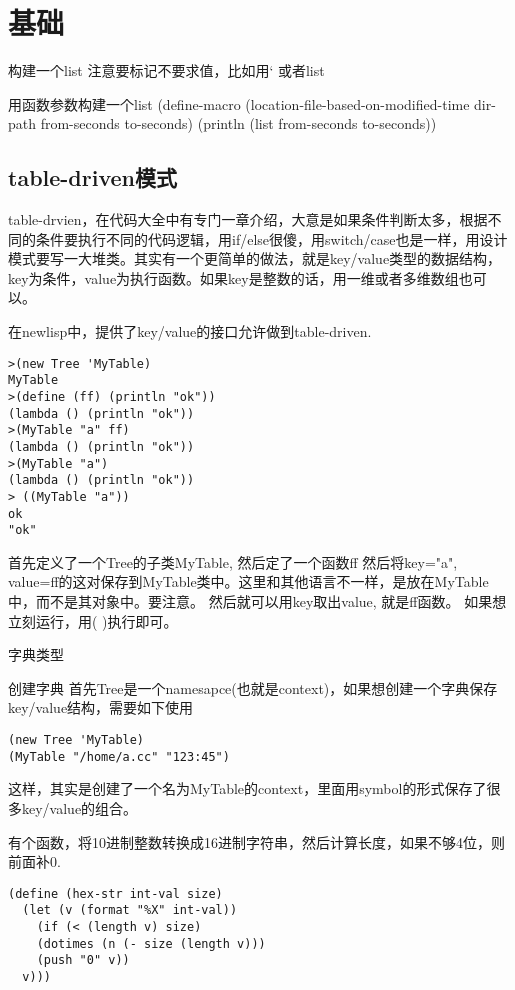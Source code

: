 \documentclass[cn,11pt]{elegantbook}
\begin{document}
\section{基础}

构建一个list
注意要标记不要求值，比如用‘ 或者list

用函数参数构建一个list
(define-macro (location-file-based-on-modified-time dir-path from-seconds to-seconds)
(println (list from-seconds to-seconds))

\subsection{table-driven模式}
table-drvien，在代码大全中有专门一章介绍，大意是如果条件判断太多，根据不同的条件要执行不同的代码逻辑，用if/else很傻，用switch/case也是一样，用设计模式要写一大堆类。其实有一个更简单的做法，就是key/value类型的数据结构，key为条件，value为执行函数。如果key是整数的话，用一维或者多维数组也可以。

在newlisp中，提供了key/value的接口允许做到table-driven.

\begin{lstlisting}[language=shell,numbers=none,nolol]
>(new Tree 'MyTable)
MyTable
>(define (ff) (println "ok"))
(lambda () (println "ok"))
>(MyTable "a" ff)
(lambda () (println "ok"))
>(MyTable "a")
(lambda () (println "ok"))
> ((MyTable "a"))
ok
"ok"

\end{lstlisting}

 
首先定义了一个Tree的子类MyTable,
然后定了一个函数ff
然后将key="a", value=ff的这对保存到MyTable类中。这里和其他语言不一样，是放在MyTable中，而不是其对象中。要注意。
然后就可以用key取出value, 就是ff函数。
如果想立刻运行，用( )执行即可。

字典类型

创建字典
首先Tree是一个namesapce(也就是context)，如果想创建一个字典保存key/value结构，需要如下使用
\begin{lstlisting}
(new Tree 'MyTable) 
(MyTable "/home/a.cc" "123:45")
\end{lstlisting}
这样，其实是创建了一个名为MyTable的context，里面用symbol的形式保存了很多key/value的组合。


有个函数，将10进制整数转换成16进制字符串，然后计算长度，如果不够4位，则前面补0.

\begin{lstlisting}
(define (hex-str int-val size)
  (let (v (format "%X" int-val))
    (if (< (length v) size)
    (dotimes (n (- size (length v)))
    (push "0" v))
  v)))
\end{lstlisting}
\end{document}
